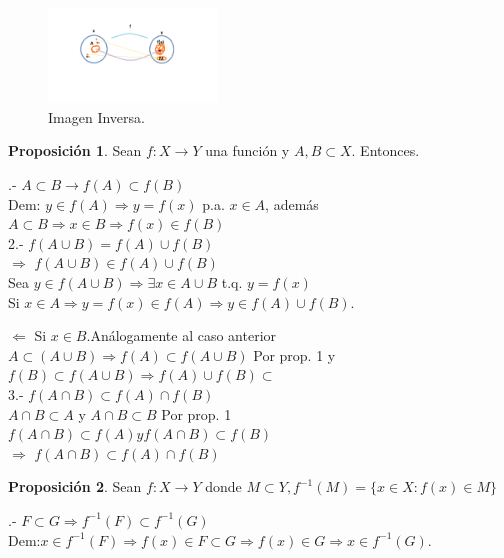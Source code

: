 \documentclass[secnumarabic,balancelastpage,amsmath,amssymb]{article}
\theoremstyle{remark}
\theoremstyle{definition}
\theoremstyle{prop}
\newtheorem{prop}{Proposición}[section]
\begin{document}
\begin{figure}[h!]
\centering
\includegraphics[width=0.4\textwidth]{imagen inversa.png}
\caption{Imagen Inversa.}
\label{fig:fig2.}
\end{figure}

\begin{prop} Sean $f:X\rightarrow Y$ una función y $A,B \subset X.$ Entonces.\\
\end{prop} 

.- $A \subset B \rightarrow f(A) \subset f(B) $\\
Dem: $y \in f(A) \Rightarrow y= f(x)$ p.a. $x \in A$, además $ A \subset B \Rightarrow x \in B \Rightarrow f(x) \in f(B)$ \\


2.- $ f(A \cup B)=f(A) \cup f(B) $\\
$\Rightarrow$ $f(A \cup B) \in f(A) \cup f(B)$\\
Sea $y \in f(A \cup B) \Rightarrow \exists x \in  A \cup B$ t.q. $y=f(x)$ \\
Si $x \in A \Rightarrow y=f(x) \in f(A) \Rightarrow y \in f(A) \cup f(B).$

$\Leftarrow$ Si $x \in B$.Análogamente al caso anterior $A \subset (A \cup B) \Rightarrow f(A) \subset f(A \cup B)$  Por prop. 1 y $f(B) \subset f(A \cup B) \Rightarrow f(A) \cup f(B) \subset$ \\

3.- $f(A \cap B) \subset f(A) \cap f(B)$\\
$A \cap B \subset A$ y $A \cap B \subset B$ Por prop. 1\\
$f(A \cap B) \subset f(A) y f(A \cap B) \subset f(B) $\\
$\Rightarrow$ $f(A \cap B) \subset f(A) \cap f(B)$\\

\begin{prop}{Sean $f:X\rightarrow Y $ donde $M \subset Y, f^{-1}(M)= \{x \in X:f(x) \in M\}$}
\end{prop}

.- $F \subset G \Rightarrow f^{-1}(F) \subset f^{-1}(G)$\\
Dem:$x \in f^{-1}(F) \Rightarrow f(x) \in F \subset G \Rightarrow f(x) \in G \Rightarrow x \in f^{-1}(G).$\\
\end{document}

